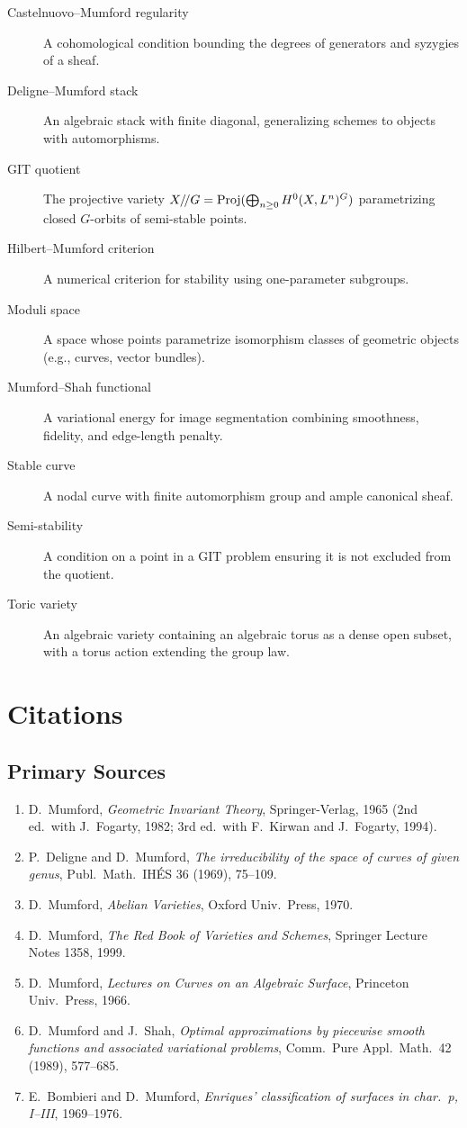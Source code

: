 \begin{description}
    \item[Castelnuovo--Mumford regularity] A cohomological condition bounding the degrees of generators and syzygies of a sheaf.
    \item[Deligne--Mumford stack] An algebraic stack with finite diagonal, generalizing schemes to objects with automorphisms.
    \item[GIT quotient] The projective variety $X/\!/G = \operatorname{Proj}(\bigoplus_{n \geq 0} H^0(X, L^n)^G)$ parametrizing closed $G$-orbits of semi-stable points.
    \item[Hilbert--Mumford criterion] A numerical criterion for stability using one-parameter subgroups.
    \item[Moduli space] A space whose points parametrize isomorphism classes of geometric objects (e.g., curves, vector bundles).
    \item[Mumford--Shah functional] A variational energy for image segmentation combining smoothness, fidelity, and edge-length penalty.
    \item[Stable curve] A nodal curve with finite automorphism group and ample canonical sheaf.
    \item[Semi-stability] A condition on a point in a GIT problem ensuring it is not excluded from the quotient.
    \item[Toric variety] An algebraic variety containing an algebraic torus as a dense open subset, with a torus action extending the group law.
\end{description}

\section{Citations}\subsection*{Primary Sources}
\begin{enumerate}
    \item D.\ Mumford, \textit{Geometric Invariant Theory}, Springer-Verlag, 1965 (2nd ed.\ with J.\ Fogarty, 1982; 3rd ed.\ with F.\ Kirwan and J.\ Fogarty, 1994).
    \item P.\ Deligne and D.\ Mumford, \textit{The irreducibility of the space of curves of given genus}, Publ.\ Math.\ IH\'ES 36 (1969), 75--109.
    \item D.\ Mumford, \textit{Abelian Varieties}, Oxford Univ.\ Press, 1970.
    \item D.\ Mumford, \textit{The Red Book of Varieties and Schemes}, Springer Lecture Notes 1358, 1999.
    \item D.\ Mumford, \textit{Lectures on Curves on an Algebraic Surface}, Princeton Univ.\ Press, 1966.
    \item D.\ Mumford and J.\ Shah, \textit{Optimal approximations by piecewise smooth functions and associated variational problems}, Comm.\ Pure Appl.\ Math.\ 42 (1989), 577--685.
    \item E.\ Bombieri and D.\ Mumford, \textit{Enriques' classification of surfaces in char.\ p, I--III}, 1969--1976.
\end{enumerate}

